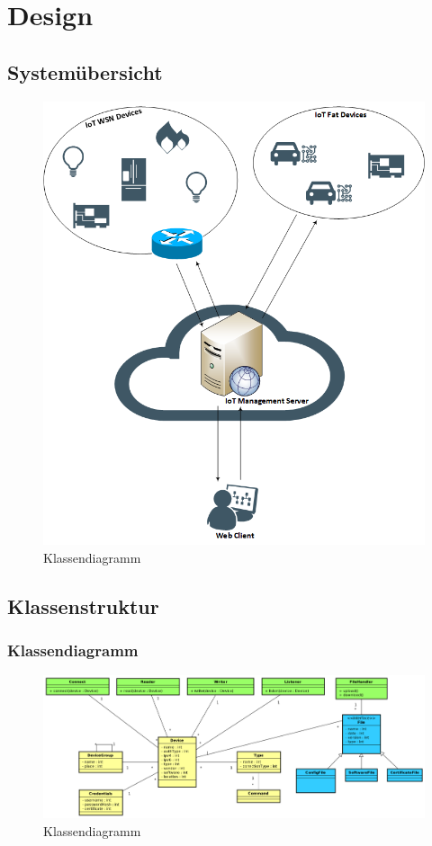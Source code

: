 
\chapter{Design}
\section{Systemübersicht}

\begin{figure}[H]
\centering
\includegraphics[width=1\textwidth]{images/systemuebersicht.png}
\caption{Klassendiagramm}
\end{figure}
\newpage

\begin{landscape}
\section{Klassenstruktur}
\subsection{Klassendiagramm}
\begin{figure}[H]
\centering
\includegraphics[width=1\textwidth]{images/domainmodel.png}
\caption{Klassendiagramm}
\end{figure}
\end{landscape}
